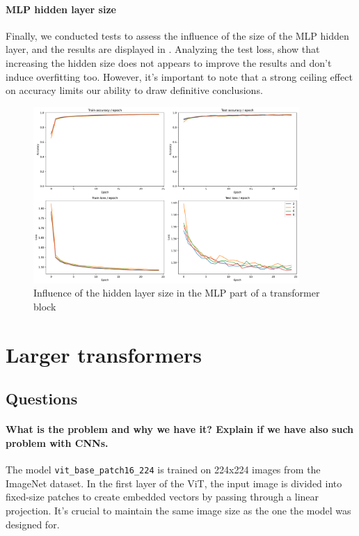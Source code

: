\paragraph{MLP hidden layer size}
Finally, we conducted tests to assess the influence of the size of the MLP hidden layer, and the results are displayed in . Analyzing the test loss, show that increasing the hidden size does not appears to improve the results and don't induce overfitting too. However, it's important to note that a strong ceiling effect on accuracy limits our ability to draw definitive conclusions.

\begin{figure}[H]
    \centering
    \includegraphics*[width=0.9\textwidth]{figs/Transformers/mlp_ratio_influence_25.pdf}
    \caption{Influence of the hidden layer size in the MLP part of a transformer block}
    \label{fig:mlp_ratio_influence}
\end{figure}

\section{Larger transformers}
\subsection{Questions}
\paragraph{What is the problem and why we have it? Explain if we have also such problem with CNNs.}
The model \texttt{vit\_base\_patch16\_224} is trained on 224x224 images from the ImageNet dataset. In the first layer of the ViT, the input image is divided into fixed-size patches to create embedded vectors by passing through a linear projection. It's crucial to maintain the same image size as the one the model was designed for.

